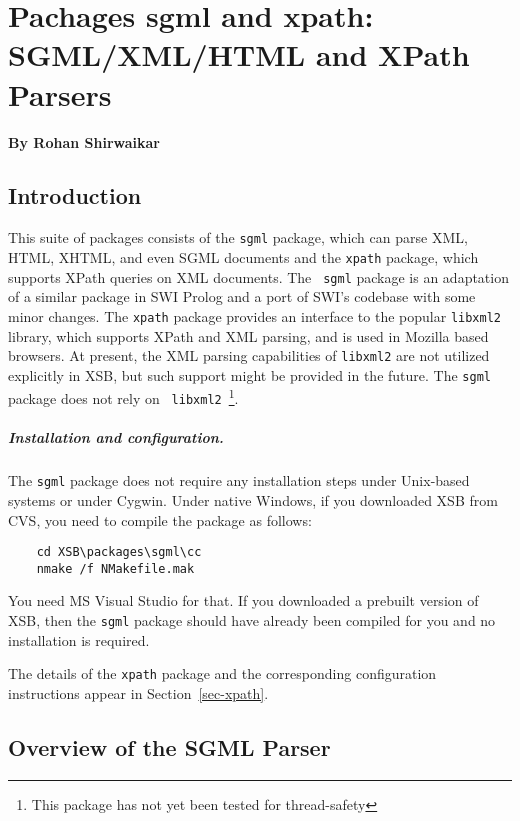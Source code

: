 
\chapter{Pachages sgml and xpath: SGML/XML/HTML and XPath Parsers}

  \begin{center}
    {\Large {\bf By Rohan Shirwaikar}}
  \end{center}



\section{Introduction}
This suite of packages consists of the {\tt sgml} package, which can
parse XML, HTML, XHTML, and even SGML documents and the {\tt xpath}
package, which supports XPath queries on XML documents.  The {\tt
  sgml} package is an adaptation of a similar package in SWI Prolog
and a port of SWI's codebase with some minor changes. The {\tt xpath}
package provides an interface to the popular {\tt libxml2} library,
which supports XPath and XML parsing, and is used in Mozilla based
browsers. At present, the XML parsing capabilities of {\tt libxml2}
are not utilized explicitly in XSB, but such support might be provided
in the future. The {\tt sgml} package does not rely on {\tt
  libxml2}~\footnote{This package has not yet been tested for
  thread-safety}.

\paragraph{Installation and configuration.}
The {\tt sgml} package does not require any installation steps under
Unix-based systems or under Cygwin. Under native Windows, if you downloaded XSB
from CVS, you need to compile the package as follows:
\begin{verbatim}
    cd XSB\packages\sgml\cc
    nmake /f NMakefile.mak
\end{verbatim}
You need MS Visual Studio for that. If you downloaded a prebuilt version
of XSB, then the {\tt sgml}  package should have already been compiled for you
and no installation is required.

The details of the {\tt xpath} package and the corresponding configuration
instructions appear in Section~\ref{sec-xpath}.

\section{Overview of the SGML Parser}

